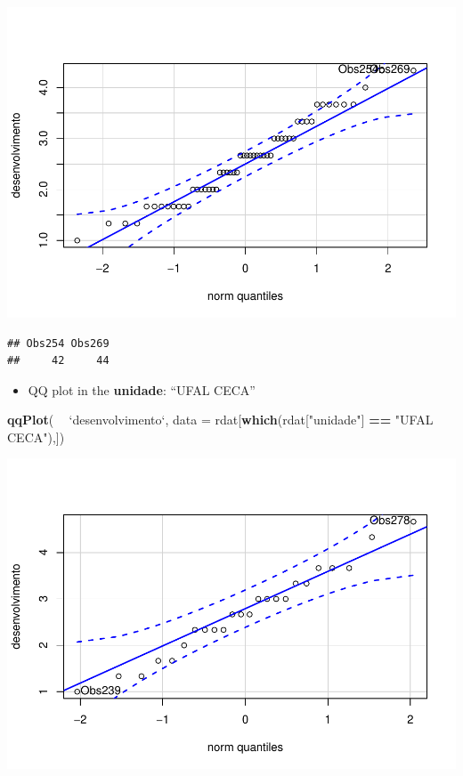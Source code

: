 \documentclass[]{article}
\newenvironment{Shaded}{\begin{snugshade}}{\end{snugshade}}
\newcommand{\DataTypeTok}[1]{\textcolor[rgb]{0.13,0.29,0.53}{#1}}
\newcommand{\KeywordTok}[1]{\textcolor[rgb]{0.13,0.29,0.53}{\textbf{#1}}}
\newcommand{\NormalTok}[1]{#1}
\newcommand{\OperatorTok}[1]{\textcolor[rgb]{0.81,0.36,0.00}{\textbf{#1}}}
\newcommand{\StringTok}[1]{\textcolor[rgb]{0.31,0.60,0.02}{#1}}
\providecommand{\tightlist}{%
  \setlength{\itemsep}{0pt}\setlength{\parskip}{0pt}}
\begin{document}
\includegraphics{factorialAnova_files/figure-latex/unnamed-chunk-10-1.pdf}

\begin{verbatim}
## Obs254 Obs269 
##     42     44
\end{verbatim}

\begin{itemize}
\tightlist
\item
  QQ plot in the \textbf{unidade}: ``UFAL CECA''
\end{itemize}

\begin{Shaded}
\begin{Highlighting}[]
\KeywordTok{qqPlot}\NormalTok{( }\OperatorTok{~}\StringTok{ `}\DataTypeTok{desenvolvimento}\StringTok{`}\NormalTok{, }\DataTypeTok{data =}\NormalTok{ rdat[}\KeywordTok{which}\NormalTok{(rdat[}\StringTok{"unidade"}\NormalTok{] }\OperatorTok{==}\StringTok{ "UFAL CECA"}\NormalTok{),])}
\end{Highlighting}
\end{Shaded}

\includegraphics{factorialAnova_files/figure-latex/unnamed-chunk-11-1.pdf}
\end{document}
